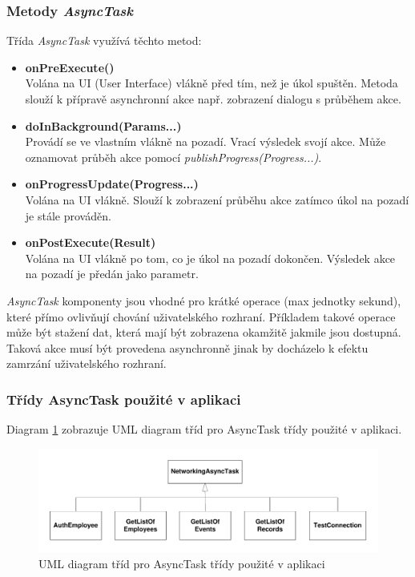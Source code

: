 \documentclass{diplomka}
\begin{document}
\subsubsection*{Metody \emph{AsyncTask}}
Třída \emph{AsyncTask} využívá těchto metod:
\begin{itemize}[]
\item \textbf{onPreExecute()}\\
Volána na UI (User Interface) vlákně před tím, než je úkol spuštěn. Metoda slouží k přípravě asynchronní akce např. zobrazení dialogu s průběhem akce.
\item \textbf{doInBackground(Params...)}\\
Provádí se ve vlastním vlákně na pozadí. Vrací výsledek svojí akce. Může oznamovat průběh akce pomocí \emph{ publishProgress(Progress...)}.
\item \textbf{onProgressUpdate(Progress...)}\\
Volána na UI vlákně. Slouží k zobrazení průběhu akce zatímco úkol na pozadí je stále prováděn.
\item \textbf{onPostExecute(Result)}\\
Volána na UI vlákně po tom, co je úkol na pozadí dokončen. Výsledek akce na pozadí je předán jako parametr.
\end{itemize}

\emph{AsyncTask} komponenty jsou vhodné pro krátké operace (max jednotky sekund), které přímo ovlivňují chování uživatelského rozhraní. Příkladem takové operace může být stažení dat, která mají být zobrazena okamžitě jakmile jsou dostupná. Taková akce musí být provedena asynchronně jinak by docházelo k efektu zamrzání uživatelského rozhraní.

\subsubsection*{Třídy AsyncTask použité v aplikaci}

Diagram \ref{fig:async} zobrazuje UML diagram tříd pro AsyncTask třídy použité v aplikaci.
\begin{figure}[H]
  \centering
  \includegraphics[scale=0.7]{visio/async.pdf}
\caption{UML diagram tříd pro AsyncTask třídy použité v aplikaci}
\label{fig:async}
\end{figure}
\end{document}
